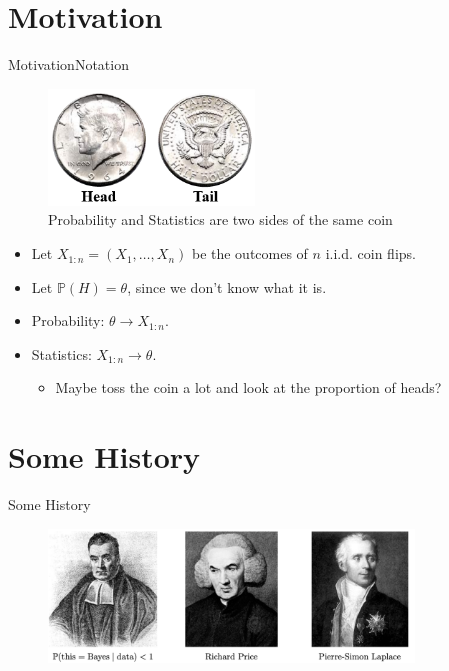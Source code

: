 \documentclass[dvipsnames,mathserif, handout]{beamer}
\begin{document}
{\section{Motivation}

\begin{frame}{Motivation}{Notation}
    \begin{figure}[!ht]
    	\includegraphics[width=155pt]{CoinToss2.png}
	\parbox{155pt}{\caption{\footnotesize  Probability and Statistics are two sides of the same coin}}
    \end{figure}

\begin{itemize}
	\item Let $X_{1:n} = (X_1, \ldots , X_n)$ be the outcomes of $n$ i.i.d. coin flips.
	\item Let $\mathbb{P} (H) = \theta$, since we don't know what it is.
	\item Probability: $\theta \longrightarrow X_{1:n}$.
	\item Statistics: $X_{1:n} \longrightarrow \theta$.
	\begin{itemize}
		\item \footnotesize Maybe toss the coin a lot and look at the proportion of heads?
	\end{itemize}
\end{itemize}
\end{frame}

\section{Some History}

\begin{frame}{Some History}
    \begin{figure}[!ht]
    	\includegraphics[width=275pt]{Bayes_etal.pdf}
    \end{figure}


\end{frame}}
\end{document}
